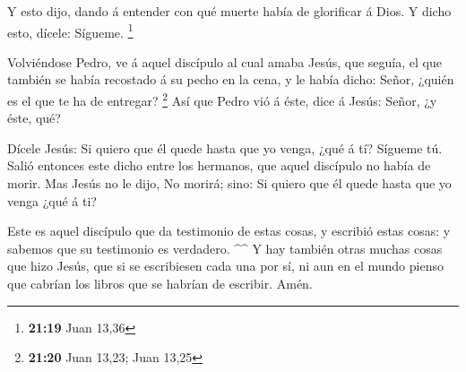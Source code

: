  Y esto dijo, dando á entender con qué muerte había de
glorificar á Dios. Y dicho esto, dícele: Sígueme. \footnote{\textbf{21:19}
  Juan 13,36}

 Volviéndose Pedro, ve á aquel discípulo al cual amaba
Jesús, que seguía, el que también se había recostado á su pecho en la
cena, y le había dicho: Señor, ¿quién es el que te ha de entregar?
\footnote{\textbf{21:20} Juan 13,23; Juan 13,25}  Así que
Pedro vió á éste, dice á Jesús: Señor, ¿y éste, qué?

 Dícele Jesús: Si quiero que él quede hasta que yo venga,
¿qué á tí? Sígueme tú.  Salió entonces este dicho entre los
hermanos, que aquel discípulo no había de morir. Mas Jesús no le dijo,
No morirá; sino: Si quiero que él quede hasta que yo venga ¿qué á ti?

 Este es aquel discípulo que da testimonio de estas cosas,
y escribió estas cosas: y sabemos que su testimonio es verdadero.
\^{}\^{}  Y hay también otras muchas cosas que hizo Jesús,
que si se escribiesen cada una por sí, ni aun en el mundo pienso que
cabrían los libros que se habrían de escribir. Amén.
